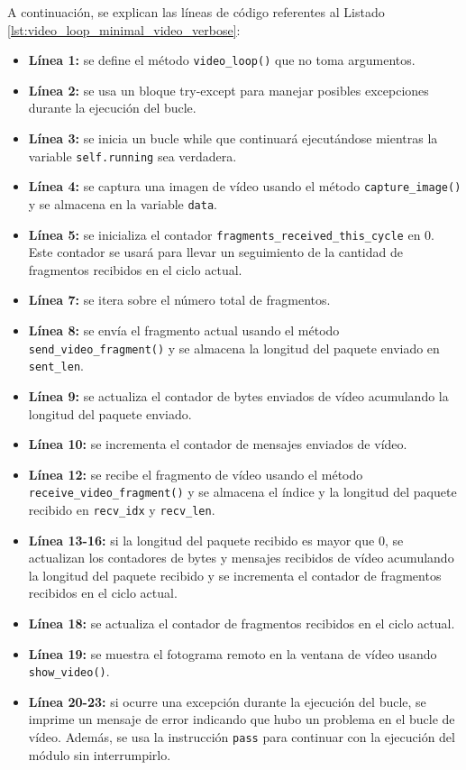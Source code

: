 A continuación, se explican las líneas de código referentes al Listado \ref{lst:video_loop_minimal_video_verbose}:
\begin{itemize}
    \item \textbf{Línea 1:} se define el método \texttt{video\_loop()} que no toma argumentos.
    \item \textbf{Línea 2:} se usa un bloque try-except para manejar posibles excepciones durante la ejecución del bucle.
    \item \textbf{Línea 3:} se inicia un bucle while que continuará ejecutándose mientras la variable \texttt{self.running} sea verdadera.
    \item \textbf{Línea 4:} se captura una imagen de vídeo usando el método \texttt{capture\_image()} y se almacena en la variable \texttt{data}.
    \item \textbf{Línea 5:} se inicializa el contador \texttt{fragments\_received\_this\_cycle} en 0. Este contador se usará para llevar un seguimiento de la cantidad de fragmentos recibidos en el ciclo actual.
    \item \textbf{Línea 7:} se itera sobre el número total de fragmentos.
    \item \textbf{Línea 8:} se envía el fragmento actual usando el método \texttt{send\_video\_fragment()} y se almacena la longitud del paquete enviado en \texttt{sent\_len}.
    \item \textbf{Línea 9:} se actualiza el contador de bytes enviados de vídeo acumulando la longitud del paquete enviado.
    \item \textbf{Línea 10:} se incrementa el contador de mensajes enviados de vídeo.
    \item \textbf{Línea 12:} se recibe el fragmento de vídeo usando el método \texttt{receive\_video\_fragment()} y se almacena el índice y la longitud del paquete recibido en \texttt{recv\_idx} y \texttt{recv\_len}.
    \item \textbf{Línea 13-16:} si la longitud del paquete recibido es mayor que 0, se actualizan los contadores de bytes y mensajes recibidos de vídeo acumulando la longitud del paquete recibido y se incrementa el contador de fragmentos recibidos en el ciclo actual.
    \item \textbf{Línea 18:} se actualiza el contador de fragmentos recibidos en el ciclo actual.
    \item \textbf{Línea 19:} se muestra el fotograma remoto en la ventana de vídeo usando \texttt{show\_video()}.
    \item \textbf{Línea 20-23:} si ocurre una excepción durante la ejecución del bucle, se imprime un mensaje de error indicando que hubo un problema en el bucle de vídeo. Además, se usa la instrucción \texttt{pass} para continuar con la ejecución del módulo sin interrumpirlo. 
\end{itemize}
\vspace{\baselineskip}

